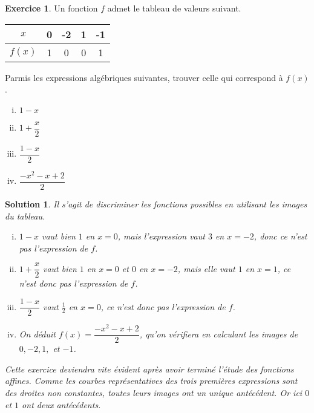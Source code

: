 \documentclass[a4paper, 14pt]{extarticle}
\theoremstyle{plain}
\newtheorem*{sol}{Solution}
\theoremstyle{definition}
\newtheorem{ex}{Exercice}
\newcommand{\exe}[2]{
		\begin{ex} #1  \end{ex}
		\begin{sol} #2 \end{sol}
	}
\newcommand{\exe}[2]{
		\begin{ex} #1  \end{ex}
	}
\begin{document}
	\exe{
		Un fonction $f$ admet le tableau de valeurs suivant.
			\begin{center}
			\begin{tabular}{|c|c|c|c|c|}\hline
				$x$ & 0 & -2 & 1 & -1 \\ \hline
				$f(x)$ & 1 & 0 & 0 & 1 \\ \hline
			\end{tabular}
			\end{center}
		Parmis les expressions algébriques suivantes, trouver celle qui correspond à $f(x)$.
			\begin{multicols}{2}
			\begin{enumerate}[i)]
				\item $1-x$
				\item $1+\dfrac{x}2$
				\item $\dfrac{1-x}2$
				\item $\dfrac{-x^2 - x + 2}2$
			\end{enumerate}
			\end{multicols}
	}{
		Il s'agit de discriminer les fonctions possibles en utilisant les images du tableau.
			\begin{enumerate}[i)]
				\item $1-x$ vaut bien $1$ en $x=0$, mais l'expression vaut $3$ en $x=-2$, donc ce n'est pas l'expression de $f$.
				\item  $1+\dfrac{x}2$ vaut bien $1$ en $x=0$ et $0$ en $x=-2$, mais elle vaut $1$ en $x=1$, ce n'est donc pas l'expression de $f$.
				\item $\dfrac{1-x}2$ vaut $\frac12$ en $x=0$, ce n'est donc pas l'expression de $f$.
				\item On déduit $f(x) = \dfrac{-x^2 - x + 2}2$, qu'on vérifiera en calculant les images de $0, -2, 1,$ et $-1$.
			\end{enumerate}
	
		Cette exercice deviendra vite évident après avoir terminé l'étude des fonctions affines. 
		Comme les courbes représentatives des trois premières expressions sont des droites non constantes, toutes leurs images ont un unique antécédent.
		Or ici $0$ et $1$ ont deux antécédents.
	}
	
	
	
	
	
\end{document}
